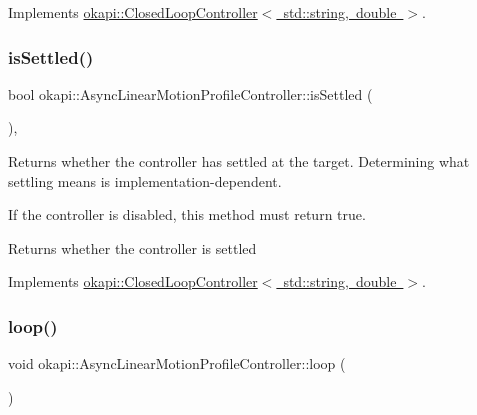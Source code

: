 Implements \mbox{\hyperlink{classokapi_1_1ClosedLoopController_a40bd4ec2b8c75503fbf6f494fd7cbe69}{okapi\+::\+Closed\+Loop\+Controller$<$ std\+::string, double $>$}}.

\mbox{\label{classokapi_1_1AsyncLinearMotionProfileController_aecfed2c6a0ead2c38253250e26ce17d4}} 
\subsubsection{\texorpdfstring{isSettled()}{isSettled()}}
{\footnotesize\ttfamily bool okapi\+::\+Async\+Linear\+Motion\+Profile\+Controller\+::is\+Settled (\begin{DoxyParamCaption}{ }\end{DoxyParamCaption})\hspace{0.3cm}{\ttfamily [override]}, {\ttfamily [virtual]}}

Returns whether the controller has settled at the target. Determining what settling means is implementation-\/dependent.

If the controller is disabled, this method must return {\ttfamily true}.

\begin{DoxyReturn}{Returns}
whether the controller is settled 
\end{DoxyReturn}


Implements \mbox{\hyperlink{classokapi_1_1ClosedLoopController_aed7aa0e94b6474c28314f8517d6cb4d8}{okapi\+::\+Closed\+Loop\+Controller$<$ std\+::string, double $>$}}.

\mbox{\label{classokapi_1_1AsyncLinearMotionProfileController_aee386f2d2697feff54005cf9e91a6e52}} 
\subsubsection{\texorpdfstring{loop()}{loop()}}
{\footnotesize\ttfamily void okapi\+::\+Async\+Linear\+Motion\+Profile\+Controller\+::loop (\begin{DoxyParamCaption}{ }\end{DoxyParamCaption})\hspace{0.3cm}{\ttfamily [protected]}}

